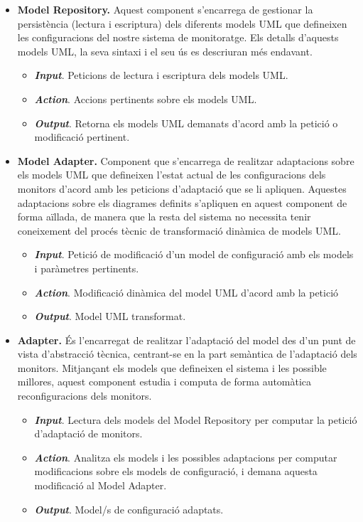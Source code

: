 \begin{itemize}
\item \textbf{Model Repository.} Aquest component s'encarrega de gestionar la persistència (lectura i escriptura) dels diferents models UML que defineixen les configuracions del nostre sistema de monitoratge. Els detalls d'aquests models UML, la seva sintaxi i el seu ús es descriuran més endavant.
\begin{itemize}
\item \textbf{\textit{Input}}. Peticions de lectura i escriptura dels models UML.
\item \textbf{\textit{Action}}. Accions pertinents sobre els models UML.
\item \textbf{\textit{Output}}. Retorna els models UML demanats d'acord amb la petició o modificació pertinent.
\end{itemize}
\item \textbf{Model Adapter.} Component que s'encarrega de realitzar adaptacions sobre els models UML que defineixen l'estat actual de les configuracions dels monitors d'acord amb les peticions d'adaptació que se li apliquen. Aquestes adaptacions sobre els diagrames definits s'apliquen en aquest component de forma aïllada, de manera que la resta del sistema no necessita tenir coneixement del procés tècnic de transformació dinàmica de models UML.
\begin{itemize}
\item \textbf{\textit{Input}}. Petició de modificació d'un model de configuració amb els models i paràmetres pertinents.
\item \textbf{\textit{Action}}. Modificació dinàmica del model UML d'acord amb la petició
\item \textbf{\textit{Output}}. Model UML transformat.
\end{itemize}
\item \textbf{Adapter.} És l'encarregat de realitzar l'adaptació del model des d'un punt de vista d'abstracció tècnica, centrant-se en la part semàntica de l'adaptació dels monitors. Mitjançant els models que defineixen el sistema i les possible millores, aquest component estudia i computa de forma automàtica reconfiguracions dels monitors.
\begin{itemize}
\item \textbf{\textit{Input}}. Lectura dels models del Model Repository per computar la petició d'adaptació de monitors.
\item \textbf{\textit{Action}}. Analitza els models i les possibles adaptacions per computar modificacions sobre els models de configuració, i demana aquesta modificació al Model Adapter.
\item \textbf{\textit{Output}}. Model/s de configuració adaptats.
\end{itemize}
\end{itemize}

